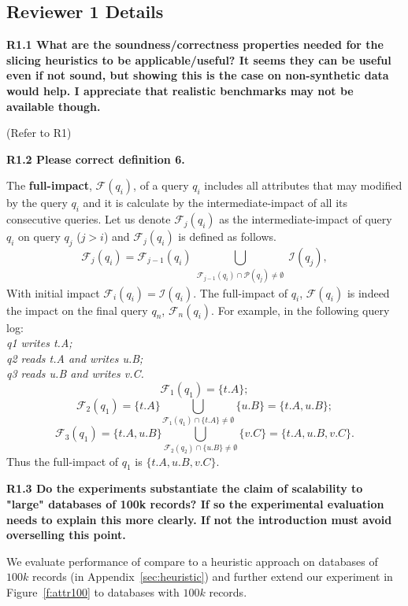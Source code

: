 \subsection*{Reviewer 1 Details}
\noindent \textbf{R1.1 What are the soundness/correctness properties needed for the slicing heuristics to be applicable/useful? It seems they can be useful even if not sound, but showing this is the case on non-synthetic data would help. I appreciate that realistic benchmarks may not be available though.}

(Refer to R1)

\noindent \textbf{R1.2 Please correct definition 6.} 

The \textbf{full-impact}, $\mathcal{F}(q_i)$, of a query $q_i$ includes all attributes that may modified by the query $q_i$ and it is calculate by the intermediate-impact of all its consecutive queries. Let us denote $\mathcal{F}_j(q_i)$ as the intermediate-impact of query $q_i$ on query $q_j$ ($j > i$) and $\mathcal{F}_j(q_i)$ is defined as follows.
 \[
    \mathcal{F}_j(q_i)=\mathcal{F}_{j-1}(q_i)\bigcup_{\substack{\mathcal{F}_{j-1}(q_i)\cap \mathcal{P}(q_j) \neq \emptyset}} \mathcal{I}(q_j),
 \]
With initial impact $\mathcal{F}_i(q_i)  = \mathcal{I}(q_i)$. The full-impact of $q_i$, $\mathcal{F}(q_i)$ is indeed the impact on the final query $q_n$, $\mathcal{F}_n(q_i)$. For example, in the following query log:\\
\textit{q1 writes t.A; \\
q2 reads t.A and writes u.B; \\
q3 reads u.B and writes v.C.}\\
\[\mathcal{F}_1(q_1) = \{t.A\};\] 
\[\mathcal{F}_2(q_1) = \{t.A\} \bigcup_{\mathcal{F}_1(q_1) \cap \{t.A\} \neq \emptyset} \{u.B\} = \{t.A, u.B\};\]
\[\mathcal{F}_3(q_1) = \{t.A, u.B\}\bigcup_{\mathcal{F}_2(q_2) \cap \{u.B\} \neq \emptyset} \{v.C\} = \{t.A, u.B, v.C\}.\]
Thus the full-impact of $q_1$ is $\{t.A, u.B, v.C\}$.

\noindent \textbf{R1.3 Do the experiments substantiate the claim of scalability to "large" databases of 100k records? If so the experimental evaluation needs to explain this more clearly. If not the introduction must avoid overselling this point.}

We evaluate performance of \sys compare to a heuristic approach on databases of $100k$ records (in Appendix~\ref{sec:heuristic}) and further extend our experiment in Figure~\ref{f:attr100} to databases with $100k$ records. 

